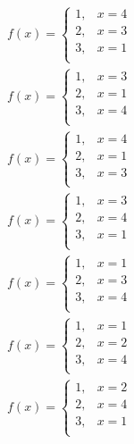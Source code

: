 \documentclass{article}
\begin{document}
\begin{eqnarray}
f(x)=\begin{cases}
1,& x=4\nonumber\\
2,& x=3\nonumber\\
3,& x=1\nonumber\\
\end{cases}
\end{eqnarray}
\begin{eqnarray}
f(x)=\begin{cases}
1,& x=3\nonumber\\
2,& x=1\nonumber\\
3,& x=4\nonumber\\
\end{cases}
\end{eqnarray}
\begin{eqnarray}
f(x)=\begin{cases}
1,& x=4\nonumber\\
2,& x=1\nonumber\\
3,& x=3\nonumber\\
\end{cases}
\end{eqnarray}
\begin{eqnarray}
f(x)=\begin{cases}
1,& x=3\nonumber\\
2,& x=4\nonumber\\
3,& x=1\nonumber\\
\end{cases}
\end{eqnarray}
\begin{eqnarray}
f(x)=\begin{cases}
1,& x=1\nonumber\\
2,& x=3\nonumber\\
3,& x=4\nonumber\\
\end{cases}
\end{eqnarray}
\begin{eqnarray}
f(x)=\begin{cases}
1,& x=1\nonumber\\
2,& x=2\nonumber\\
3,& x=4\nonumber\\
\end{cases}
\end{eqnarray}
\begin{eqnarray}
f(x)=\begin{cases}
1,& x=2\nonumber\\
2,& x=4\nonumber\\
3,& x=1\nonumber\\
\end{cases}
\end{eqnarray}
\end{document}
